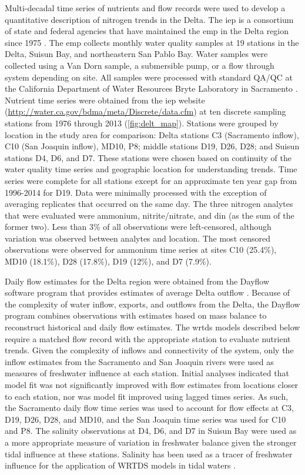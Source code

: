 \documentclass[journal = esthag, manuscript = article]{achemso}\usepackage[]{graphicx}\usepackage[]{color}
\begin{document}
Multi-decadal time series of nutrients and flow records were used to develop a quantitative description of nitrogen trends in the Delta.  The \ac{iep} is a consortium of state and federal agencies that have maintained the \ac{emp} in the Delta region since 1975 \cite{IEP13}.  The \ac{emp} collects monthly water quality samples at 19 stations in the Delta, Suisun Bay, and northeastern San Pablo Bay.  Water samples were collected using a Van Dorn sample, a submersible pump, or a flow through system depending on site.  All samples were processed with standard QA/QC at the California Department of Water Resources Bryte Laboratory in Sacramento \cite{IEP13}.  Nutrient time series were obtained from the \ac{iep} website (\url{http://water.ca.gov/bdma/meta/Discrete/data.cfm}) at ten discrete sampling stations from 1976 through 2013 (\cref{fig:delt_map}).  Stations were grouped by location in the study area for comparison: Delta stations C3 (Sacramento inflow), C10 (San Joaquin inflow), MD10, P8; middle stations D19, D26, D28; and Suisun stations D4, D6, and D7.  These stations were chosen based on continuity of the water quality time series and geographic location for understanding trends.  Time series were complete for all stations except for an approximate ten year gap from 1996-2014 for D19.  Data were minimally processed with the exception of averaging replicates that occurred on the same day.  The three nitrogen analytes that were evaluated were ammonium, nitrite/nitrate, and \ac{din} (as the sum of the former two). Less than 3\% of all observations were left-censored, although variation was observed between analytes and location.  The most censored observations were observed for ammonium time series at sites C10 (25.4\%), MD10 (18.1\%), D28 (17.8\%), D19 (12\%), and D7 (7.9\%).

Daily flow estimates for the Delta region were obtained from the Dayflow software program that provides estimates of average Delta outflow \cite{IEP16}.  Because of the complexity of water inflow, exports, and outflows from the Delta, the Dayflow program combines observations with estimates based on mass balance to reconstruct historical and daily flow estimates.  The \ac{wrtds} models described below require a matched flow record with the appropriate station to evaluate nutrient trends. Given the complexity of inflows and connectivity of the system, only the inflow estimates from the Sacramento and San Joaquin rivers were used as measures of freshwater influence at each station.  Initial analyses indicated that model fit was not significantly improved with flow estimates from locations closer to each station, nor was model fit improved using lagged times series.  As such, the Sacramento daily flow time series was used to account for flow effects at C3, D19, D26, D28, and MD10, and the San Joaquin time series was used for C10 and P8.  The salinity observations at D4, D6, and D7 in Suisun Bay were used as a more appropriate measure of variation in freshwater balance given the stronger tidal influence at these stations.  Salinity has been used as a tracer of freshwater influence for the application of WRTDS models in tidal waters \cite{Beck15}.  
\end{document}
